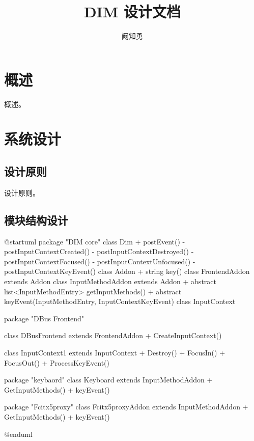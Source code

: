 \documentclass{utart}
\title{DIM 设计文档}
\author{阙知勇}
\begin{document}
\utMakeTitle{}


\utMakeTOC

\section{概述}

概述。

\section{系统设计}

    \subsection{设计原则}

        设计原则。

    \subsection{模块结构设计}
        \begin{plantuml}
        @startuml
        package "DIM core" {
            class Dim {
                + postEvent()
                - postInputContextCreated()
                - postInputContextDestroyed()
                - postInputContextFocused()
                - postInputContextUnfocused()
                - postInputContextKeyEvent()
            }
            class Addon {
                + string key()
            }
            class FrontendAddon extends Addon {
            }
            class InputMethodAddon extends Addon {
                + {abstract} list<InputMethodEntry> getInputMethods()
                + {abstract} keyEvent(InputMethodEntry, InputContextKeyEvent)
            }
            class InputContext {
            }
        }

        package "DBus Frontend" {
            class DBusFrontend extends FrontendAddon {
                + CreateInputContext()
            }

            class InputContext1 extends InputContext {
                + Destroy()
                + FocusIn()
                + FocusOut()
                + ProcessKeyEvent()
            }
        }

        package "keybaord" {
            class Keyboard extends InputMethodAddon {
                + GetInputMethods()
                + keyEvent()
            }
        }

        package "Fcitx5proxy" {
            class Fcitx5proxyAddon extends InputMethodAddon {
                + GetInputMethods()
                + keyEvent()
            }
        }

        @enduml
        \end{plantuml}
\end{document}
